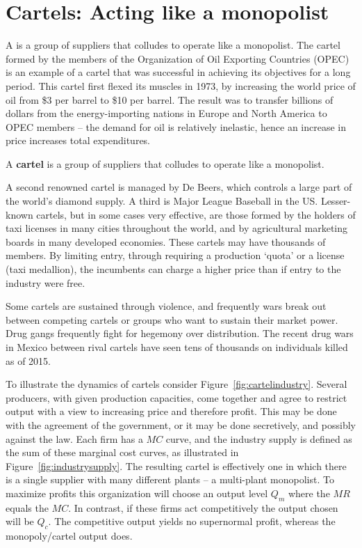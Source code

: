 \section{Cartels: Acting like a monopolist}\label{sec:ch10sec6}

A  is a group of suppliers that colludes to operate like
a monopolist. The cartel formed by the members of the Organization of
Oil Exporting Countries (OPEC) is an example of a cartel that was successful
in achieving its objectives for a long period. This cartel first flexed its
muscles in 1973, by increasing the world price of oil from \$3 per barrel to
\$10 per barrel. The result was to transfer billions of dollars from the
energy-importing nations in Europe and North America to OPEC members -- the
demand for oil is relatively inelastic, hence an increase in price increases
total expenditures.

\begin{DefBox}
	A \textbf{cartel} is a group of suppliers that colludes to operate like a monopolist.
\end{DefBox}

A second renowned cartel is managed by De Beers, which controls a large part
of the world's diamond supply. A third is Major League Baseball in the US.
Lesser-known cartels, but in some cases very effective, are those formed by
the holders of taxi licenses in many cities throughout the world, and by
agricultural marketing boards in many developed economies. These cartels may
have thousands of members. By limiting entry, through requiring a production
`quota' or a license (taxi medallion), the incumbents can charge a higher
price than if entry to the industry were free.

Some cartels are sustained through violence, and frequently wars break out
between competing cartels or groups who want to sustain their market power.
Drug gangs frequently fight for hegemony over distribution. The recent drug
wars in Mexico between rival cartels have seen tens of thousands on
individuals killed as of 2015.

\newhtmlpage

To illustrate the dynamics of cartels consider Figure~\ref{fig:cartelindustry}.
Several producers, with given production capacities,
come together and agree to restrict output with a view to increasing price
and therefore profit. This may be done with the agreement of the government,
or it may be done secretively, and possibly against the law. Each firm has a 
$MC$ curve, and the industry supply is defined as the sum of these marginal
cost curves, as illustrated in Figure~\ref{fig:industrysupply}. The
resulting cartel is effectively one in which there is a single supplier with
many different plants -- a multi-plant monopolist. To maximize profits this
organization will choose an output level $Q_{m}$ where the $MR$ equals the 
$MC$. In contrast, if these firms act competitively the output chosen will be 
$Q_{c}$. The competitive output yields no supernormal profit, whereas the
monopoly/cartel output does.

